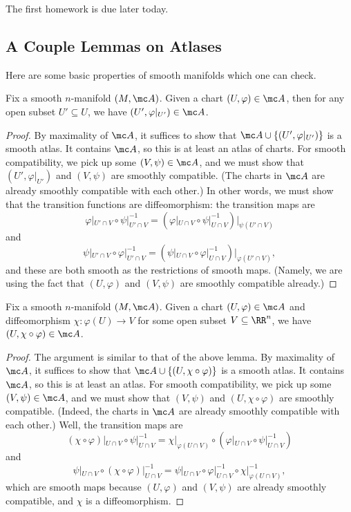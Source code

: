 \documentclass[../notes.tex]{subfiles}
\begin{document}
The first homework is due later today.

\subsection{A Couple Lemmas on Atlases}
Here are some basic properties of smooth manifolds which one can check.
\begin{lemma} \label{lem:res-chart}
	Fix a smooth $n$-manifold $(M,\mc A)$. Given a chart $(U,\varphi)\in\mc A$, then for any open subset $U'\subseteq U$, we have $(U',\varphi|_{U'})\in\mc A$.
\end{lemma}
\begin{proof}
	By maximality of $\mc A$, it suffices to show that $\mc A\cup\{(U',\varphi|_{U'})\}$ is a smooth atlas. It contains $\mc A$, so this is at least an atlas of charts. For smooth compatibility, we pick up some $(V,\psi)\in\mc A$, and we must show that $(U',\varphi|_{U'})$ and $(V,\psi)$ are smoothly compatible. (The charts in $\mc A$ are already smoothly compatible with each other.) In other words, we must show that the transition functions are diffeomorphism: the transition maps are
	\[\varphi|_{U'\cap V}\circ\psi|_{U'\cap V}^{-1}=\left(\varphi|_{U\cap V}\circ\psi|_{U\cap V}^{-1}\right)|_{\psi(U'\cap V)}\]
	and
	\[\psi|_{U'\cap V}\circ\varphi|_{U'\cap V}^{-1}=\left(\psi|_{U\cap V}\circ\varphi|_{U\cap V}^{-1}\right)|_{\varphi(U'\cap V)},\]
	and these are both smooth as the restrictions of smooth maps. (Namely, we are using the fact that $(U,\varphi)$ and $(V,\psi)$ are smoothly compatible already.)
\end{proof}
\begin{lemma}
	Fix a smooth $n$-manifold $(M,\mc A)$. Given a chart $(U,\varphi)\in\mc A$ and diffeomorphism $\chi\colon\varphi(U)\to V$ for some open subset $V\subseteq\RR^n$, we have $(U,\chi\circ\varphi)\in\mc A$.
\end{lemma}
\begin{proof}
	The argument is similar to that of the above lemma. By maximality of $\mc A$, it suffices to show that $\mc A\cup\{(U,\chi\circ\varphi)\}$ is a smooth atlas. It contains $\mc A$, so this is at least an atlas. For smooth compatibility, we pick up some $(V,\psi)\in\mc A$, and we must show that $(V,\psi)$ and $(U,\chi\circ\varphi)$ are smoothly compatible. (Indeed, the charts in $\mc A$ are already smoothly compatible with each other.) Well, the transition maps are
	\[(\chi\circ\varphi)|_{U\cap V}\circ\psi|_{U\cap V}^{-1}=\chi|_{\varphi(U\cap V)}\circ\left(\varphi|_{U\cap V}\circ\psi|_{U\cap V}^{-1}\right)\]
	and
	\[\psi|_{U\cap V}\circ(\chi\circ\varphi)|_{U\cap V}^{-1}=\psi|_{U\cap V}\circ\varphi|_{U\cap V}^{-1}\circ\chi|_{\varphi(U\cap V)}^{-1},\]
	which are smooth maps because $(U,\varphi)$ and $(V,\psi)$ are already smoothly compatible, and $\chi$ is a diffeomorphism.
\end{proof}
\end{document}
